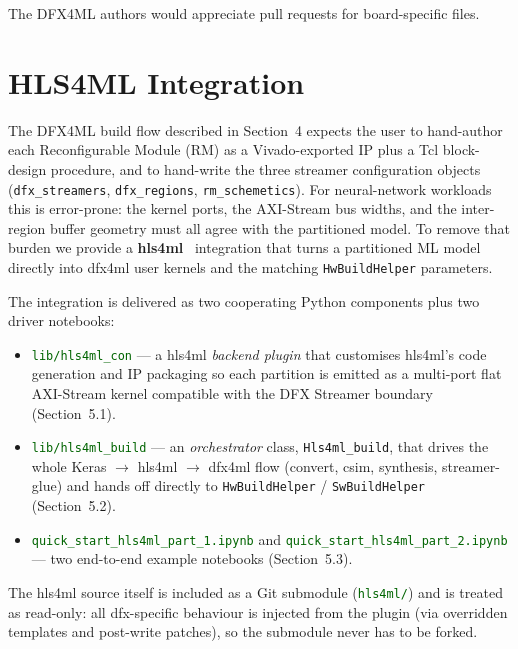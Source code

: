 \documentclass{cernatsnote}
\begin{document}
The DFX4ML authors would appreciate pull requests for board-specific files.




\section{HLS4ML Integration}

The DFX4ML build flow described in Section~4 expects the user to hand-author
each Reconfigurable Module (RM) as a Vivado-exported IP plus a Tcl block-design
procedure, and to hand-write the three streamer configuration objects
(\texttt{dfx\_streamers}, \texttt{dfx\_regions}, \texttt{rm\_schemetics}). For
neural-network workloads this is error-prone: the kernel ports, the AXI-Stream bus
widths, and the inter-region buffer geometry must all agree with the partitioned
model. To remove that burden we provide a
\textbf{hls4ml}~\cite{fastml_hls4ml} integration that turns a partitioned ML
model directly into dfx4ml user kernels and the matching \texttt{HwBuildHelper}
parameters.

The integration is delivered as two cooperating Python components plus two driver 
notebooks:

\begin{itemize}
  \item \textcolor{darkgreen}{\texttt{lib/hls4ml\_con}} --- a hls4ml \emph{backend
        plugin} that customises hls4ml's code generation and IP packaging so each
        partition is emitted as a multi-port flat AXI-Stream kernel compatible with
        the DFX Streamer boundary (Section~5.1).
  \item \textcolor{darkgreen}{\texttt{lib/hls4ml\_build}} --- an \emph{orchestrator}
        class, \texttt{Hls4ml\_build}, that drives the whole Keras
        $\rightarrow$ hls4ml $\rightarrow$ dfx4ml flow (convert, csim, synthesis,
        streamer-glue) and hands off directly to \texttt{HwBuildHelper} /
        \texttt{SwBuildHelper} (Section~5.2).
  \item \textcolor{darkgreen}{\texttt{quick\_start\_hls4ml\_part\_1.ipynb}} and
        \textcolor{darkgreen}{\texttt{quick\_start\_hls4ml\_part\_2.ipynb}} --- two
        end-to-end example notebooks (Section~5.3).
\end{itemize}

\noindent
The hls4ml source itself is included as a Git submodule
(\textcolor{darkgreen}{\texttt{hls4ml/}}) and is treated as read-only: all
dfx-specific behaviour is injected from the plugin (via overridden templates and
post-write patches), so the submodule never has to be forked.
\end{document}
